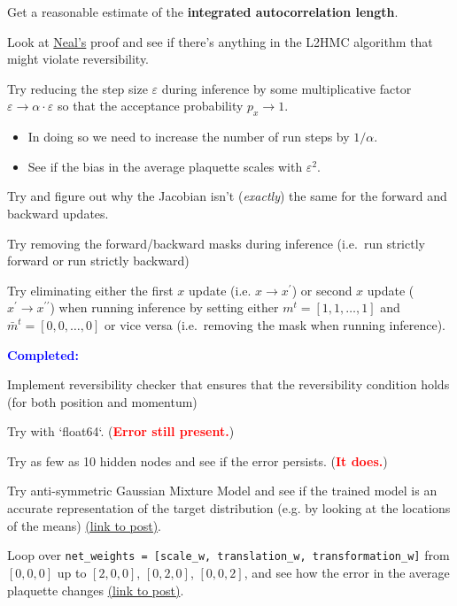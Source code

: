 \documentclass[11pt]{article}
\newcommand{\cmark}{\ding{51}}%
\newcommand{\done}{\rlap{$\square$}{\raisebox{2pt}{\large\hspace{1pt}\cmark}}%
\hspace{-2.5pt}}
\begin{document}
\begin{todolist}
    \item Get a reasonable estimate of the \textbf{integrated
      autocorrelation length}.
    \item Look at \href{https://arxiv.org/pdf/1206.1901.pdf}{Neal's} proof and see if there's anything in the L2HMC algorithm that might violate reversibility.
    \item Try reducing the step size $\varepsilon$ during inference by some multiplicative factor $\varepsilon \rightarrow \alpha \cdot \varepsilon$ so that the acceptance probability $p_x \rightarrow 1$.
    \begin{itemize}
        \item In doing so we need to increase the number of run steps by $1/\alpha$.
      \item See if the bias in the average plaquette scales with $\varepsilon^2$.
    \end{itemize}
    \item Try and figure out why the Jacobian isn’t (\emph{exactly}) the same for the forward and backward updates.
    \item Try removing the forward/backward masks during inference (i.e.\ run strictly forward or run strictly backward)
    \item Try eliminating either the first $x$ update (i.e. $x \rightarrow
      x^{\prime}$) or second $x$ update ($x^{\prime} \rightarrow
      x^{\prime\prime}$) when running inference by setting either
      $m^{t} = [1, 1, \ldots, 1]$ and $\bar{m}^{t} = [0, 0, \ldots, 0]$ or
      vice versa (i.e.\  removing the mask when running inference).
\end{todolist}

\vspace{1cm}
\noindent
\textbf{\textcolor{blue}{\huge Completed:}}\\
\begin{todolist}
    \item[\done] Implement reversibility checker that ensures that the reversibility condition holds (for both position and momentum)
    \item[\done] Try with `float64`. (\textbf{\textcolor{red}{Error still present.}})
    \item[\done] Try as few as 10 hidden nodes and see if the error persists. (\textbf{\textcolor{red}{It does.}})
        \item[\done] Try anti-symmetric Gaussian Mixture Model and see if the trained model is an accurate representation of the target distribution (e.g. by looking at the locations of the means) \href{https://l2hmc.slack.com/archives/CK0SMC6NS/p1567623563026900}{(link to post)}.
    \item[\done] Loop over 
        \verb+net_weights = [scale_w, translation_w, transformation_w]+
    from $[0, 0, 0]$ up to $[2, 0, 0]$, $[0, 2, 0]$, $[0, 0, 2]$, and see how the error in the average plaquette changes \href{https://l2hmc.slack.com/archives/ck0smc6ns/p1567036227006600}{(link to post)}.
\end{todolist}
\end{document}
